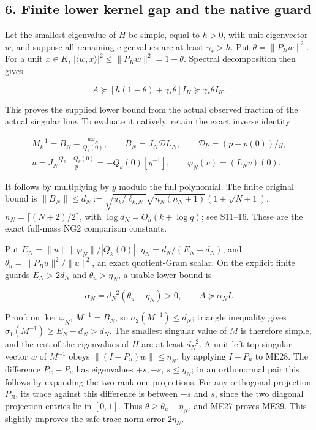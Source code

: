 \documentclass[11pt]{article}
\begin{document}
\subsection{6. Finite lower kernel gap and the native guard}\label{finite-lower-kernel-gap-and-the-native-guard}

Let the smallest eigenvalue of \(H\) be simple, equal to \(h>0\), with unit eigenvector \(w\), and suppose all remaining eigenvalues are at least \(\gamma_*>h\). Put \(\theta=\|P_Bw\|^2\). For a unit \(x\in K\), \(|\langle w,x\rangle|^2\le\|P_Kw\|^2=1-\theta\). Spectral decomposition then gives

\[
\boxed{A\succeq[h(1-\theta)+\gamma_*\theta]I_K
\succeq\gamma_*\theta I_K.}
\tag{ME27}
\]

This proves the supplied lower bound from the actual observed fraction of the actual singular line. To evaluate it natively, retain the exact inverse identity

\[
\begin{gathered}
M_k^{-1}=B_N-\frac{u\varphi_N}{Q_k(0)},\qquad
B_N=J_N\mathscr D L_N,\qquad \mathscr Dp=(p-p(0))/y,\\
u=J_N\frac{Q_k-Q_k(0)}y=-Q_k(0)[y^{-1}],\qquad
\varphi_N(v)=(L_Nv)(0).
\end{gathered}
\tag{ME28}
\]

It follows by multiplying by \(y\) modulo the full polynomial. The finite original bound is \(\|B_N\|\le d_N:=\sqrt{u_k/\ell_{k,N}}\sqrt{n_N(n_N+1)}(1+\sqrt{N+1})\), \(n_N=\lceil(N+2)/2\rceil\), with \(\log d_N=O_h(k+\log q)\); see \href{https://github.com/KokunoYumeto/zeta-function-research-reader/blob/edd4008690952fb8568a01744e49ad7e180401e9/workbenches/splitzero-tandem/continuations/20260921-original-observation/NATIVE_SMALLEST_SINGULAR_PROOF.tex\#L64}{S11--16}. These are the exact full-mass NG2 comparison constants.

Put \(E_N=\|u\|\|\varphi_N\|/|Q_k(0)|\), \(\eta_N=d_N/(E_N-d_N)\), and \(\theta_u=\|P_Bu\|^2/\|u\|^2\), an exact quotient-Gram scalar. On the explicit finite guards \(E_N>2d_N\) and \(\theta_u>\eta_N\), a usable lower bound is

\[
\boxed{\alpha_N=d_N^{-2}(\theta_u-\eta_N)>0,\qquad A\succeq\alpha_NI.}
\tag{ME29}
\]

Proof: on \(\ker\varphi_N\), \(M^{-1}=B_N\), so \(\sigma_2(M^{-1})\le d_N\); triangle inequality gives \(\sigma_1(M^{-1})\ge E_N-d_N>d_N\). The smallest singular value of \(M\) is therefore simple, and the rest of the eigenvalues of \(H\) are at least \(d_N^{-2}\). A unit left top singular vector \(w\) of \(M^{-1}\) obeys \(\|(I-P_u)w\|\le\eta_N\), by applying \(I-P_u\) to ME28. The difference \(P_w-P_u\) has eigenvalues \(+s,-s\), \(s\le\eta_N\); in an orthonormal pair this follows by expanding the two rank-one projections. For any orthogonal projection \(P_B\), its trace against this difference is between \(-s\) and \(s\), since the two diagonal projection entries lie in \([0,1]\). Thus \(\theta\ge\theta_u-\eta_N\), and ME27 proves ME29. This slightly improves the safe trace-norm error \(2\eta_N\).
\end{document}
